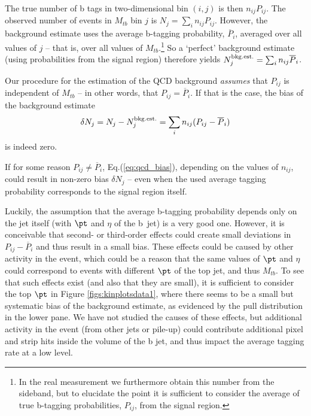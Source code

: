 The true number of b tags in two-dimensional bin $(i,j)$ is then
$n_{ij} P_{ij}$.  The observed number of events in $M_{tb}$ bin $j$ is
$N_j = \sum_i n_{ij} P_{ij}$.  However, the background
estimate uses the average b-tagging probability, $\overline P_i$,
averaged over all values of $j$ -- that is, over all values of 
$M_{tb}$.\footnote{In the real measurement we
furthermore obtain this number from the sideband, but to elucidate the
point it is sufficient to consider the average of true b-tagging
probabilities, $P_{ij}$, from the signal region.} 
So a `perfect' background estimate (using probabilities from the
signal region) therefore
yields $N_j^{\rm bkg.est.} = \sum_i n_{ij} \overline P_i$.

Our procedure for the estimation of the QCD background {\it assumes}
that $P_{ij}$ is independent of $M_{tb}$ -- in other words, that
$P_{ij} = \overline P_i$.  If that is the case, the bias of the
background estimate
\begin{equation}
  \delta N_j = N_j - N_j^{\rm bkg.est.} = \sum_i n_{ij} (P_{ij} - \overline P_i)
  \label{eq:qcd_bias}
\end{equation}
is indeed zero.

If for some reason $P_{ij} \neq \overline P_i$, 
Eq.(\ref{eq:qcd_bias}), depending on the values of $n_{ij}$, could
result in non-zero bias $\delta N_j$ -- even when the used 
average tagging probability
corresponds to the signal region itself.

Luckily, the assumption that the average b-tagging probability
depends only on the jet itself (with $\pt$ and $\eta$ of the b~jet)
is a very good one.  However, it is conceivable that second- or
third-order effects could create small deviations in 
$P_{ij} - \overline P_i$ and thus result in a small bias.
These effects could be caused by other activity in the event,
which could be a reason that the same values of $\pt$ and $\eta$ 
could correspond to events with different $\pt$ of the top jet,
and thus $M_{tb}$. To see that such effects exist (and also that
they are small), it is sufficient to consider the top $\pt$ in
Figure \ref{figs:kinplotsdata1}, where there seems to be a small but systematic bias of
the background estimate, as evidenced by the pull distribution
in the lower pane.  We have not studied the causes of these
effects, but additional activity in the event (from other
jets or pile-up) could contribute additional pixel and
strip hits inside the volume of the b jet, and thus impact
the average tagging rate at a low level.

